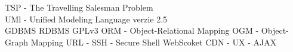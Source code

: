 TSP - The Travelling Salesman Problem\\
UMl - Unified Modeling Language verzie 2.5\\
GDBMS
RDBMS
GPLv3
ORM - Object-Relational Mapping
OGM - Object-Graph Mapping
URL - 
SSH - Secure Shell
WebScoket
CDN -
UX -
AJAX